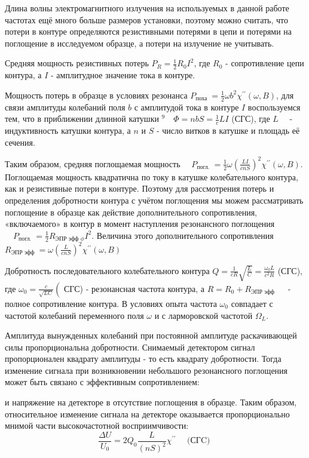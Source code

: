 \documentclass[a4paper, 12pt]{article}%
\begin{document}
	Длина волны электромагнитного излучения на используемых в данной работе частотах ещё много больше размеров установки, поэтому можно считать, что потери в контуре определяются резистивными потерями в цепи и потерями на поглощение в исследуемом образце, а потери на излучение не учитывать.
	
	Средняя мощность резистивных потерь $P_R=\frac{1}{2} R_0 I^2$, где $R_0$ - сопротивление цепи контура, а $I$ - амплитудное значение тока в контуре.
	
	Мощность потерь в образце в условиях резонанса $P_{\text {поха }}=\frac{1}{2} \omega b^2 \chi^{\prime \prime}(\omega, B)$, для связи амплитуды колебаний поля $b$ с амплитудой тока в контуре $I$ воспользуемся тем, что в приближении длинной катушки ${ }^9 \quad \Phi=n b S=\frac{1}{c} L I$ (СГС), где $L \quad$ - индуктивность катушки контура, а $n$ и $S$ - число витков в катушке и площадь её сечения.
	
	Таким образом, средняя поглощаемая мощность $\quad P_{\text {погл. }}=\frac{1}{2} \omega\left(\frac{L I}{c n S}\right)^2 \chi^{\prime \prime}(\omega, B)$. Поглощаемая мощность квадратична по току в катушке колебательного контура, как и резистивные потери в контуре. Поэтому для рассмотрения потерь и определения добротности контура с учётом поглощения мы можем рассматривать поглощение в образце как действие дополнительного сопротивления, «включаемого» в контур в момент наступления резонансного поглощения $\quad P_{\text {погл. }}=\frac{1}{2} R_{\text {ЭПР эфф } \phi} I^2$. Величина этого дополнительного сопротивления $R_{\text {ЭПР эфф }}=\omega\left(\frac{L}{c n S}\right)^2 \chi^{\prime \prime}(\omega, B)$
	
	Добротность последовательного колебательного контура $Q=\frac{1}{c R} \sqrt{\frac{L}{C}}=\frac{\omega_0 L}{c^2 R}$ (СГС), где $\omega_0=\frac{c}{\sqrt{L C}}\left(\right.$ СГС) - резонансная частота контура, а $R=R_0+R_{\text {ЭПР эфф }} \quad$ - полное сопротивление контура. В условиях опыта частота $\omega_0$ совпадает с частотой колебаний переменного поля $\omega$ и с ларморовской частотой $\Omega_L$.
	
	Амплитуда вынужденных колебаний при постоянной амплитуде раскачивающей силы пропорциональна добротности. Снимаемый детектором сигнал пропорционален квадрату амплитуды - то есть квадрату добротности. Тогда изменение сигнала при возникновении небольшого резонансного поглощения может быть связано с эффективным сопротивлением:
	
	и напряжение на детекторе в отсутствие поглощения в образце.
	Таким образом, относительное изменение сигнала на детекторе оказывается пропорционально мнимой части высокочастотной восприимчивости:
	$$
	\frac{\Delta U}{U_0}=2 Q_0 \frac{L}{(n S)^2} \chi^{\prime \prime} \quad \text { (СГC) }
	$$
	
\end{document}
